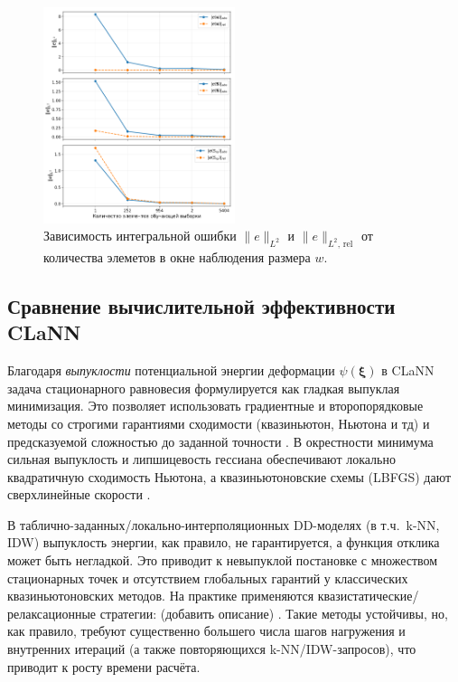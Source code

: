   \begin{figure}[H]
    \centering
    \includegraphics[width=0.5\textwidth]{img/integral_errors.png}
    \caption{Зависимость интегральной ошибки $\|e\|_{L^2}$ и $\|e\|_{L^2,\,\mathrm{rel}}$ от количества элеметов в окне наблюдения размера $w$.}
    \label{fig:integral_errors}
  \end{figure}
  
  
\subsection{Сравнение вычислительной эффективности CLaNN}

  Благодаря \emph{выпуклости} потенциальной энергии деформации $\psi(\boldsymbol\xi)$ в CLaNN задача стационарного равновесия формулируется
  как гладкая выпуклая минимизация. Это позволяет использовать градиентные и второпорядковые методы со строгими гарантиями сходимости
  (квазиньютон, Ньютона и тд)
  и предсказуемой сложностью до заданной точности \cite{BoydVandenberghe2004,Nesterov2004,NocedalWright2006,ConnGouldToint2000}.
  В окрестности минимума сильная выпуклость и липшицевость гессиана обеспечивают локально квадратичную сходимость Ньютона,
  а квазиньютоновские схемы (L\textendash BFGS) дают сверхлинейные скорости \cite{NocedalWright2006}.

  В таблично-заданных/локально-интерполяционных DD-моделях (в т.ч.\ k-NN, IDW) выпуклость энергии, как правило, не гарантируется,
  а функция отклика может быть негладкой. Это приводит к невыпуклой постановке с множеством стационарных точек и
  отсутствием глобальных гарантий у классических квазиньютоновских методов. На практике применяются
  квазистатические/релаксационные стратегии: (добавить описание) \cite{KirchdoerferOrtiz2016,KirchdoerferOrtiz2017}.
  Такие методы устойчивы, но, как правило, требуют существенно большего числа шагов нагружения и внутренних итераций
  (а также повторяющихся k-NN/IDW-запросов), что приводит к росту времени расчёта.

